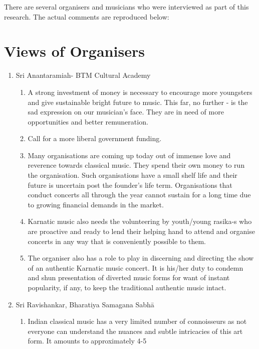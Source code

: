 There are several organisers and musicians who were interviewed as part of this research. The actual comments are reproduced below:


\section*{Views of Organisers}

\begin{enumerate}
\itemsep=0pt
\item Sri Anantaramiah- BTM Cultural Academy
 
\begin{enumerate}
\itemsep=0pt
\item A strong investment of money is necessary to encourage more youngsters and give sustainable bright future to music. This far, no further - is the sad expression on our musician’s face. They are in need of more opportunities and better remuneration.

 \item Call for a more liberal government funding.

 \item Many organisations are coming up today out of immense love and reverence towards classical music. They spend their own money to run the organisation. Such organisations have a small shelf life and their future is uncertain post the founder’s life term. Organisations that conduct concerts all through the year cannot sustain for a long time due to growing financial demands in the market.

 \item Karnatic music also needs the volunteering by youth/young rasika-s who are proactive and ready to lend their helping hand to attend and organise concerts in any way that is conveniently possible to them.

 \item The organiser also has a role to play in discerning and directing the show of an authentic Karnatic music concert. It is his/her duty to condemn and shun presentation of diverted music forms for want of instant popularity, if any, to keep the traditional authentic music intact.
\end{enumerate}

 \item Sri Ravishankar, Bharatiya Samagana Sabhā
 
\begin{enumerate}
\itemsep=0pt
\item Indian classical music has a very limited number of connoisseurs as not everyone can understand the nuances and subtle intricacies of this art form. It amounts to approximately 4-5\\%


\end{enumerate}
\end{enumerate}
